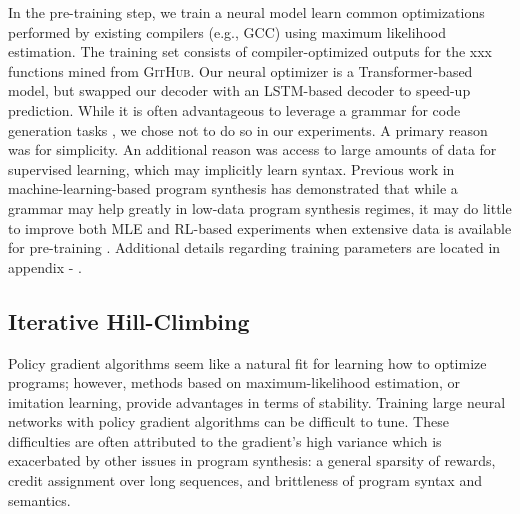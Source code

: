 \documentclass{article}
\begin{document}
In the pre-training step, we train a neural model learn common optimizations performed by existing compilers (e.g., GCC) using maximum likelihood estimation. 
The training set consists of compiler-optimized outputs for the xxx  functions mined from \textsc{GitHub}.
Our neural optimizer is a Transformer-based model, but swapped our decoder with an LSTM-based decoder to speed-up prediction. 
While it is often advantageous to leverage a grammar for code generation tasks \citep{yin-neubig-2017-syntactic, parisotto2016neuro}, we chose not to do so in our experiments. A primary reason was for simplicity. An additional reason was access to large amounts of data for supervised learning, which may implicitly learn syntax. Previous work in machine-learning-based program synthesis has demonstrated that while a grammar may help greatly in low-data program synthesis regimes, it may do little to improve both MLE and RL-based experiments when extensive data is available for pre-training \cite{bunel2018leveraging}. Additional details regarding training parameters are located in appendix - . 


\subsection{Iterative Hill-Climbing}

Policy gradient algorithms seem like a natural fit for learning how to optimize programs; however, methods based on maximum-likelihood estimation, or imitation learning, provide advantages in terms of stability. Training large neural networks with policy gradient algorithms can be difficult to tune. These difficulties are often attributed to the gradient's high variance which is exacerbated by other issues in program synthesis: a general sparsity of rewards, credit assignment over long sequences, and brittleness of program syntax and semantics. 
\end{document}
